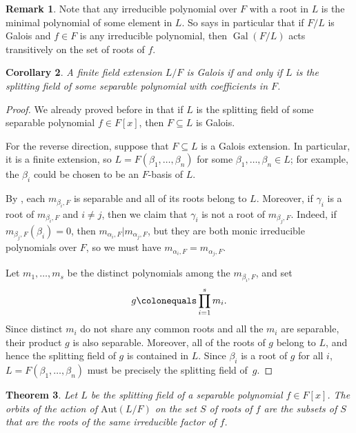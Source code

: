 \documentclass[12pt]{report}
\newtheorem{theorem}{Theorem}[chapter]
\newtheorem{corollary}[theorem]{Corollary}
\numberwithin{equation}{section}
\numberwithin{theorem}{chapter}
\theoremstyle{definition}
\newtheorem*{basic properties}{Basic Properties}
\newtheorem*{Important Remark}{Important Remark}
\newtheorem{remark}[theorem]{Remark}
\DeclareMathOperator{\Gal}{Gal}
\begin{document}
\begin{remark}
	Note that any irreducible polynomial over $F$ with a root in $L$ is the minimal polynomial of some element in $L$.
So  says in particular that if $F/L$ is Galois and $f \in F$ is any irreducible polynomial, then $\Gal(F/L)$ acts transitively on the set of roots of $f$.
\end{remark}




\begin{corollary}\label{galois iff splitting field of separable poly}
	A finite field extension $L/F$ is Galois if and only if $L$ is the splitting field of some separable polynomial with coefficients in $F$.
\end{corollary}

\begin{proof} 
We already proved before in  that if $L$ is the splitting field of some separable polynomial $f \in F[x]$, then $F \subseteq L$ is Galois. 

For the reverse direction, suppose that $F \subseteq L$ is a Galois extension. In particular, it is a finite extension, so $L = F(\beta_1, \ldots, \beta_n)$ for some $\beta_1, \dots, \beta_n \in L$; for example, the $\beta_i$ could be chosen to be an $F$-basis of $L$.

By , each $m_{\beta_i,F}$ is separable and all of its roots belong to $L$. Moreover, if $\gamma_i$ is a root of $m_{\beta_i,F}$ and $i \neq j$, then we claim that $\gamma_i$ is not a root of $m_{\beta_j,F}$. Indeed, if $m_{\beta_j,F}(\beta_i) = 0$, then $m_{\alpha_i,F} | m_{\alpha_j,F}$, but they are both monic irreducible polynomials over $F$, so we must have $m_{\alpha_i,F} = m_{\alpha_j,F}$.

Let $m_1, \ldots, m_s$ be the distinct polynomials among the $m_{\beta_i,F}$, and set
$$g \colonequals \prod_{i=1}^s m_i.$$ 
Since distinct $m_i$ do not share any common roots and all the $m_i$ are separable, their product $g$ is also separable. Moreover, all of the roots of $g$ belong to $L$, and hence the splitting field of $g$ is contained in $L$. Since $\beta_i$ is a root of $g$ for all $i$, $L = F(\beta_1, \ldots, \beta_n)$ must be precisely the splitting field of~$g$.
\end{proof}


\begin{theorem}
	Let $L$ be the splitting field of a separable polynomial $f \in F[x]$. The orbits of the action of $\mathrm{Aut}(L/F)$ on the set $S$ of roots of $f$ are the subsets of $S$ that are the roots of the same irreducible factor of $f$.
\end{theorem}
\end{document}
